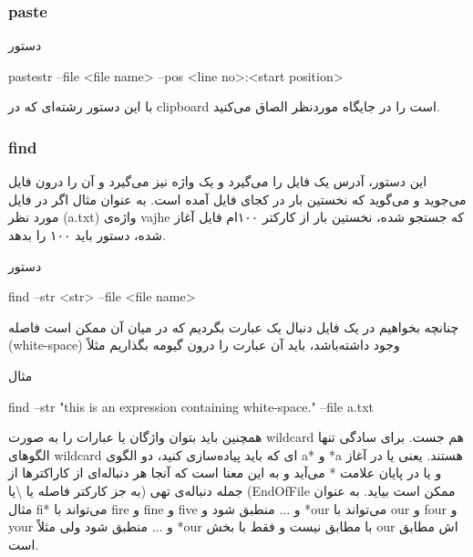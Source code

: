 \documentclass[]{article}
\begin{document}
\subsubsection*{{\titr paste}}

\begin{mybox}[colback=yellow]{دستور}
	\begin{latin}	
		pastestr --file <file name> --pos <line no>:<start position>
	\end{latin}
\end{mybox}

با این دستور رشته‌ای که در clipboard است را در جایگاه موردنظر الصاق می‌کنید.



\newpage
\subsubsection*{{\titr find}}

این دستور، آدرس یک فایل را می‌گیرد و یک واژه نیز می‌گیرد و آن را درون فایل می‌جوید و می‌گوید که نخستین بار در کجای فایل آمده است. به عنوان مثال اگر در فایل مورد نظر (a.txt) واژه‌ی vajhe که جستجو شده، نخستین بار از کارکتر ۱۰۰ام فایل آغاز شده، دستور  باید ۱۰۰ را بدهد.\\

\begin{mybox}[colback=yellow]{دستور}
	\begin{latin}	
		find --str <str> --file <file name>
	\end{latin}
\end{mybox}


چنانچه بخواهیم در یک فایل دنبال یک عبارت بگردیم که در میان آن ممکن است فاصله (white-space) وجود داشته‌باشد، باید آن عبارت را درون گیومه بگذاریم مثلاً

\begin{mybox}[colback=yellow]{مثال}
	\begin{latin}	
		find --str "this is an expression containing white-space." --file a.txt
	\end{latin}
\end{mybox}

همچنین باید بتوان واژگان یا عبارات را به صورت wildcard هم جست. برای سادگی تنها الگوهای wildcard ای که باید پیاده‌سازی کنید، دو الگوی a* و *a هستند. یعنی یا در آغاز و یا در پایان علامت * می‌آید و به این معنا است که آنجا هر دنباله‌ای از کاراکترها از جمله دنباله‌ی تهی (به جز کارکتر فاصله یا \textbackslash یا (EndOfFile ممکن است بیاید. به عنوان مثال fi* می‌تواند با fire و fine و five و ... منطبق شود و *our می‌تواند با our و four و your و ... منطبق شود ولی مثلاً *our با  مطابق نیست و فقط با بخش our اش مطابق است.\\
\end{document}
